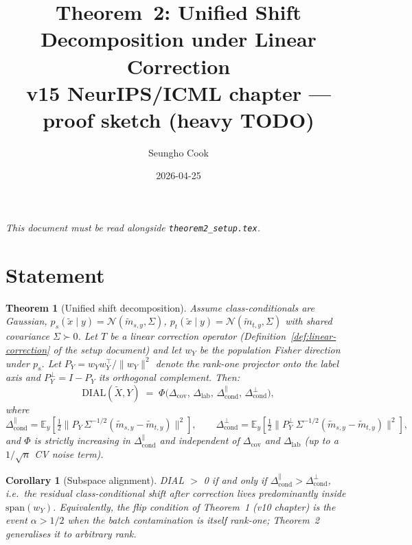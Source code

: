 \documentclass[11pt,a4paper]{article}
\title{Theorem~2: Unified Shift Decomposition under Linear Correction\\
\large v15 NeurIPS/ICML chapter --- proof sketch (heavy TODO)}
\author{Seungho Cook}
\date{2026-04-25}
\newtheorem{theorem}{Theorem}
\newtheorem{corollary}{Corollary}
\newcommand{\E}{\mathbb{E}}
\begin{document}
\maketitle
\noindent\emph{This document must be read alongside
\texttt{theorem2\_setup.tex}.}

\section{Statement}

\begin{theorem}[Unified shift decomposition]
\label{thm:unified}
Assume class-conditionals are Gaussian,
$p_s(\tilde x\mid y) = \mathcal{N}(\tilde m_{s,y},\Sigma)$,
$p_t(\tilde x\mid y) = \mathcal{N}(\tilde m_{t,y},\Sigma)$ with
shared covariance $\Sigma\succ 0$. Let $T$ be a linear correction
operator (Definition~\ref{def:linear-correction} of the setup
document) and let $w_Y$ be the population Fisher direction under
$p_s$. Let $P_Y = w_Y w_Y^{\top}/\|w_Y\|^{2}$ denote the rank-one
projector onto the label axis and $P_Y^{\perp}=I-P_Y$ its
orthogonal complement. Then:
\begin{equation}
  \mathrm{DIAL}(\tilde X,Y)
  \;=\; \Phi\!\bigl(\Delta_{\text{cov}},\,\Delta_{\text{lab}},\,
                     \Delta_{\text{cond}}^{\parallel},\,
                     \Delta_{\text{cond}}^{\perp}\bigr),
  \label{eq:thm2}
\end{equation}
where
\[
   \Delta_{\text{cond}}^{\parallel}
   = \E_{y}\!\left[\tfrac12\bigl\|P_Y\,\Sigma^{-1/2}
     (\tilde m_{s,y}-\tilde m_{t,y})\bigr\|^{2}\right],\qquad
   \Delta_{\text{cond}}^{\perp}
   = \E_{y}\!\left[\tfrac12\bigl\|P_Y^{\perp}\,\Sigma^{-1/2}
     (\tilde m_{s,y}-\tilde m_{t,y})\bigr\|^{2}\right],
\]
and $\Phi$ is \emph{strictly increasing in $\Delta_{\text{cond}}^{\parallel}$
and independent of $\Delta_{\text{cov}}$ and $\Delta_{\text{lab}}$} (up
to a $1/\sqrt{n}$ CV noise term).
\end{theorem}

\begin{corollary}[Subspace alignment]
\label{cor:subspace}
DIAL $>$ 0 if and only if
$\Delta_{\text{cond}}^{\parallel} > \Delta_{\text{cond}}^{\perp}$, i.e.\
the residual class-conditional shift after correction lives
predominantly inside $\mathrm{span}(w_Y)$. Equivalently, the flip
condition of Theorem~1 (v10 chapter) is the event $\alpha>1/2$ when
the batch contamination is itself rank-one; Theorem~2 generalises it
to arbitrary rank.
\end{corollary}
\end{document}
